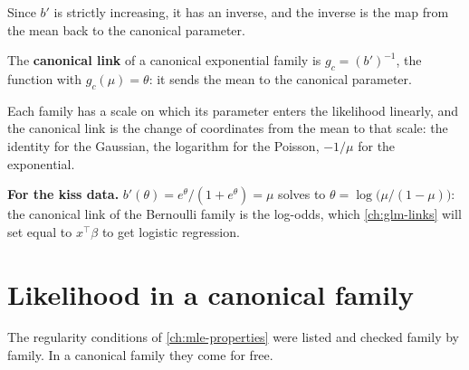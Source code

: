 Since $b'$ is strictly increasing, it has an inverse, and the inverse is the map from the mean back to the canonical parameter.

\begin{definition}
\label{def:canonical-link}
The \textbf{canonical link} of a canonical exponential family is $g_c = (b')^{-1}$, the function with $g_c(\mu) = \theta$: it sends the mean to the canonical parameter.
\end{definition}

\begin{inwords}
Each family has a scale on which its parameter enters the likelihood linearly, and the canonical link is the change of coordinates from the mean to that scale: the identity for the Gaussian, the logarithm for the Poisson, $-1/\mu$ for the exponential.

\textbf{For the kiss data.} $b'(\theta) = e^\theta/(1 + e^\theta) = \mu$ solves to $\theta = \log\big(\mu/(1 - \mu)\big)$: the canonical link of the Bernoulli family is the log-odds, which \cref{ch:glm-links} will set equal to $x^\top\beta$ to get logistic regression.
\end{inwords}

\section{Likelihood in a canonical family}
\label{sec:ef-likelihood}

The regularity conditions of \cref{ch:mle-properties} were listed and checked family by family.
In a canonical family they come for free.

